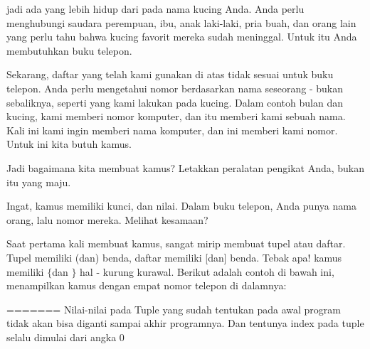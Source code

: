 jadi ada yang lebih hidup dari pada nama kucing Anda. Anda perlu menghubungi saudara perempuan, ibu, anak laki-laki, pria buah, dan orang lain yang perlu tahu bahwa kucing favorit mereka sudah meninggal. Untuk itu Anda membutuhkan buku telepon. \par
\vspace{12pt}
Sekarang, daftar yang telah kami gunakan di atas tidak sesuai untuk buku telepon. Anda perlu mengetahui nomor berdasarkan nama seseorang - bukan sebaliknya, seperti yang kami lakukan pada kucing. Dalam contoh bulan dan kucing, kami memberi nomor komputer, dan itu memberi kami sebuah nama. Kali ini kami ingin memberi nama komputer, dan ini memberi kami nomor. Untuk ini kita butuh kamus. \par
\vspace{12pt}
Jadi bagaimana kita membuat kamus? Letakkan peralatan pengikat Anda, bukan itu yang maju. \par
\vspace{12pt}
Ingat, kamus memiliki kunci, dan nilai. Dalam buku telepon, Anda punya nama orang, lalu nomor mereka. Melihat kesamaan? \par
\vspace{12pt}
Saat pertama kali membuat kamus, sangat mirip membuat tupel atau daftar. Tupel memiliki (dan) benda, daftar memiliki [dan] benda. Tebak apa! kamus memiliki  $  \{  $dan $  \}  $ hal - kurung kurawal. Berikut adalah contoh di bawah ini, menampilkan kamus dengan empat nomor telepon di dalamnya: \par
=======
Nilai-nilai pada Tuple yang sudah tentukan pada awal program tidak akan bisa diganti sampai akhir programnya. Dan tentunya index pada tuple selalu dimulai dari angka 0 

